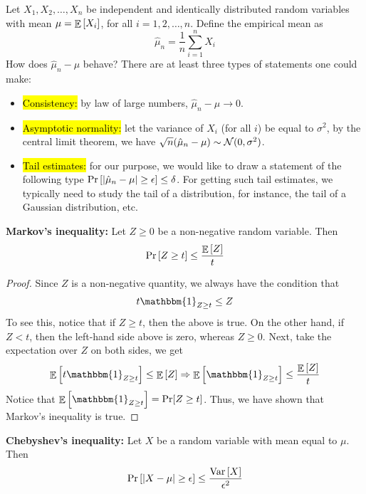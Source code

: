 \begin{example}
Let $X_1, X_2, \dots, X_n$ be independent and identically distributed random variables with mean $\mu = \mathop{\mathbb{E}}\left[ X_i \right]$, for all $i = 1, 2, \dots, n$.
Define the empirical mean as \[ \hat \mu_n = \frac 1 n \sum_{i=1}^n X_i \]
How does $\hat \mu_n - \mu$ behave?
There are at least three types of statements one could make:
\begin{itemize}
    \item \hl{Consistency:} by law of large numbers, $\hat \mu_n - \mu \rightarrow 0$.

    \item \hl{Asymptotic normality:} let the variance of $X_i$ (for all $i$) be equal to $\sigma^2$, by the central limit theorem, we have $\sqrt{n} (\hat \mu_n - \mu) \sim \mathcal{N}(0, \sigma^2)$.

    \item \hl{Tail estimates:} for our purpose, we would like to draw a statement of the following type $\Pr\left[ {\left| {\hat \mu_n - \mu} \right|} \ge \epsilon \right] \le \delta$.
    For getting such tail estimates, we typically need to study the tail of a distribution, for instance, the tail of a Gaussian distribution, etc.
\end{itemize}
\end{example}

\begin{mdframed}[
    roundcorner=10pt,
    leftmargin=0.1\textwidth,
    rightmargin=0.1\textwidth]
    \textbf{Markov's inequality:}
    Let $Z \ge 0$ be a non-negative random variable. Then
    \[ \Pr\left[Z \ge t \right] \le \frac {\mathop{\mathbb{E}}\left[ Z \right]} t \]
\end{mdframed}

\begin{proof}
Since $Z$ is a non-negative quantity, we always have the condition that
\[ t \mathbbm{1}_{Z \ge t} \le Z \]
To see this, notice that if $Z \ge t$, then the above is true.
On the other hand, if $Z < t$, then the left-hand side above is zero, whereas $Z \ge 0$.
Next, take the expectation over $Z$ on both sides, we get
\[ \ex{t \mathbbm{1}_{Z \ge t}} \le \ex{Z} \Rightarrow \ex{\mathbbm{1}_{Z \ge t}} \le \frac {\ex{Z}} {t} \]
Notice that $\ex{\mathbbm{1}_{Z \ge t}} = \Pr[Z \ge t]$.
Thus, we have shown that Markov's inequality is true.
\end{proof}

\begin{mdframed}[
    roundcorner=10pt,
    leftmargin=0.1\textwidth,
    rightmargin=0.1\textwidth]
    \textbf{Chebyshev's inequality:}
Let $X$ be a random variable with mean equal to $\mu$. Then
\[ \Pr\left [ {\left| {X - \mu} \right|} \ge \epsilon \right] \le \frac {\mathop{\textup{Var}}\left[ X \right]} {\epsilon^2} \]
\end{mdframed}

